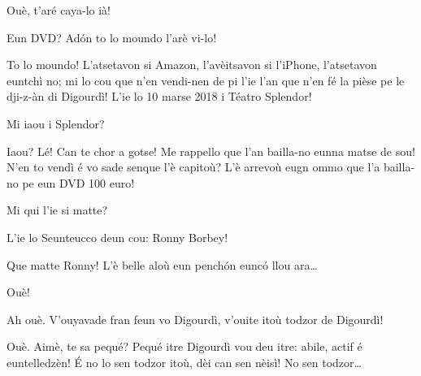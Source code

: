 \begin{drama}
\Paganspeaks Ouè, t'aré caya-lo ià!

\Nevaousaspeaks Eun DVD? Ad\'on to lo moundo l'arè vi-lo!

\Paganspeaks To lo moundo! L'atsetavon si Amazon, l'avèitsavon si l'iPhone, l'atsetavon euntchì no; mi lo cou que n'en vendi-nen de pi l'ie l'an que n'en fé la pièse pe le dji-z-àn di Digourdì! L'ie lo 10 marse 2018 i Téatro Splendor!

\Nevaouspeaks Mi iaou i Splendor?

\Paganspeaks Iaou?  Lé! Can te chor a gotse! Me rappello que l'an bailla-no eunna matse de sou! N'en to vendì é vo sade senque l'è capitoù? L'è arrevoù eugn ommo que l'a bailla-no pe eun DVD 100 euro!

\Nevaousaspeaks Mi qui l'ie si matte?

\Maganspeaks L'ie lo Seunteucco deun cou: Ronny Borbey!

\Paganspeaks Que matte Ronny! L'è belle aloù eun pench\'on euncó llou ara\ldots

\Maganspeaks Ouè!

\Nevaouspeaks Ah ouè. V'ouyavade fran feun vo Digourdì, v'ouite itoù todzor de Digourdì!

\Paganspeaks Ouè. Aimè, te sa pequé? Pequé itre Digourdì vou deu itre: abile, actif é euntelledzèn! \'E no lo sen todzor itoù, dèi can sen nèisì! No sen todzor\ldots 


\ridocliou

\DeriLeRido




\end{drama}
